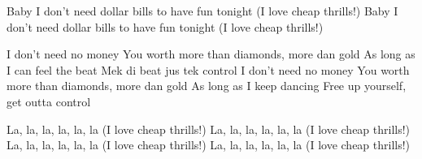 \begin{guitar}
Baby I don't need dollar bills to have fun tonight
(I love cheap thrills!)
Baby I don't need dollar bills to have fun tonight
(I love cheap thrills!)

I don't need no money
You worth more than diamonds, more dan gold
As long as I can feel the beat
Mek di beat jus tek control
I don't need no money
You worth more than diamonds, more dan gold
As long as I keep dancing
Free up yourself, get outta control

La, la, la, la, la, la
(I love cheap thrills!)
La, la, la, la, la, la
(I love cheap thrills!)
La, la, la, la, la, la
(I love cheap thrills!)
La, la, la, la, la, la
(I love cheap thrills!)
\end{guitar}